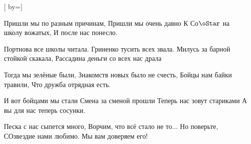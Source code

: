 [
  by={}]

\pchk

\psk


\beginverse
Пришли мы по разным причинам,
Пришли мы очень давно
К Со$\oStar$ на школу вожатых,
И после нас понесло.
\bqk

Портнова все школы читала.
Гриненко тусить всех звала.
Милусь за барной стойкой скакала,
Рассадина деньги со всех нас драла
\bqk

Тогда мы зелёные были,
Знакомств новых было не счесть,
Бойцы нам байки травили,
Что дружба отрядная есть.
\bqk

И вот бойцами мы стали
Смена за сменой прошли
Теперь нас зовут стариками
А вы для нас теперь сосунки.
\endverse


\beginchorus
Песка с нас сыпется много,
Ворчим, что всё стало не то...
Но поверьте, СОзвездие нами любимо.
Мы вам доверяем его!
\endchorus


\beginverse

\endverse


\beginverse

\endverse


\endsong


